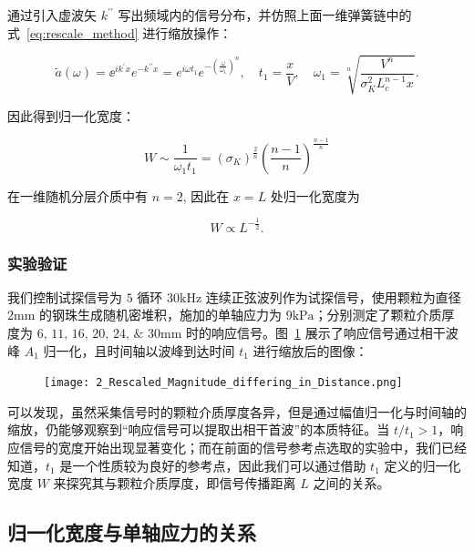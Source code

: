 通过引入虚波矢 $k^{\prime\prime}$ 写出频域内的信号分布，并仿照上面一维弹簧链中的式~\eqref{eq:rescale_method} 进行缩放操作：

\begin{equation}
  \widetilde{a}(\omega) = {\ee}^{ik^{\prime}x}e^{-k^{\prime\prime}x} = e^{i\omega t_{1}}e^{-\left(\frac{\omega}{\omega_{1}}\right)^{n}},\quad t_{1} = \frac{x}{V},\quad \omega_{1} = \sqrt[n]{\frac{V^{n}}{\sigma_{K}^{2}L_{c}^{n-1}x}}.
\end{equation}

因此得到归一化宽度：

\begin{equation}
W\sim \frac{1}{\omega_{1}t_{1}} = (\sigma_{K})^{\frac{2}{n}}\left(\frac{n-1}{n}\right)^{\frac{n-1}{n}}
\end{equation}

在一维随机分层介质中有 $n=2$, 因此在 $x = L$ 处归一化宽度为

\begin{equation}
  W\propto L^{-\frac{1}{2}}.
\end{equation}

\subsubsection{实验验证}

我们控制试探信号为 $5$ 循环 $30\unit{\kilo\Hz}$ 连续正弦波列作为试探信号，使用颗粒为直径 $2\unit{\milli\meter}$ 的钢珠生成随机密堆积，施加的单轴应力为 $9\unit{\kilo\Pa}$；分别测定了颗粒介质厚度为 $\numlist{6;11;16;20;24;30}\unit{\milli\metre}$ 时的响应信号。图~\ref{fig:reference_point} 展示了响应信号通过相干波峰 $A_{1}$ 归一化，且时间轴以波峰到达时间 $t_{1}$ 进行缩放后的图像：

\begin{figure}[!htp]
  \centering
  \texttt{[image: 2\_Rescaled\_Magnitude\_differing\_in\_Distance.png]}
  \label{fig:reference_point}
\end{figure}

可以发现，虽然采集信号时的颗粒介质厚度各异，但是通过幅值归一化与时间轴的缩放，仍能够观察到“响应信号可以提取出相干首波”的本质特征。当 $t/t_{1} > 1$，响应信号的宽度开始出现显著变化；而在前面的信号参考点选取的实验中，我们已经知道，$t_{1}$ 是一个性质较为良好的参考点，因此我们可以通过借助 $t_{1}$ 定义的归一化宽度 $W$ 来探究其与颗粒介质厚度，即信号传播距离 $L$ 之间的关系。

\subsection{归一化宽度与单轴应力的关系}


